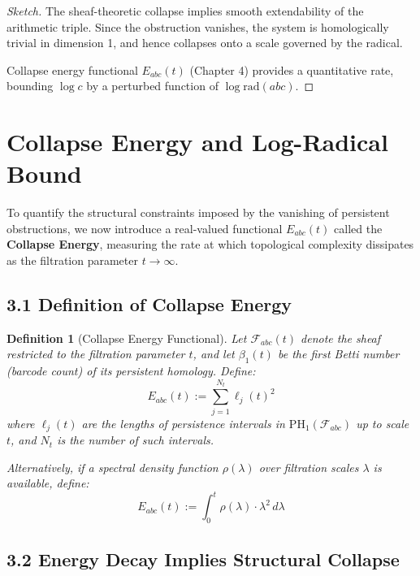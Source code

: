 \documentclass[11pt]{article}
\newtheorem{definition}[theorem]{Definition}
\begin{document}
\begin{proof}[Sketch]
The sheaf-theoretic collapse implies smooth extendability of the arithmetic triple. Since the obstruction vanishes, the system is homologically trivial in dimension 1, and hence collapses onto a scale governed by the radical.

Collapse energy functional $E_{abc}(t)$ (Chapter 4) provides a quantitative rate, bounding $\log c$ by a perturbed function of $\log \mathrm{rad}(abc)$.
\end{proof}



\section{Collapse Energy and Log-Radical Bound}

To quantify the structural constraints imposed by the vanishing of persistent obstructions, we now introduce a real-valued functional \( E_{abc}(t) \) called the \textbf{Collapse Energy}, measuring the rate at which topological complexity dissipates as the filtration parameter \( t \to \infty \).

\subsection{3.1 Definition of Collapse Energy}

\begin{definition}[Collapse Energy Functional]
Let \( \mathcal{F}_{abc}(t) \) denote the sheaf restricted to the filtration parameter \( t \), and let \( \beta_1(t) \) be the first Betti number (barcode count) of its persistent homology. Define:
\[
E_{abc}(t) := \sum_{j=1}^{N_t} \ell_j(t)^2
\]
where \( \ell_j(t) \) are the lengths of persistence intervals in \( \mathrm{PH}_1(\mathcal{F}_{abc}) \) up to scale \( t \), and \( N_t \) is the number of such intervals.

Alternatively, if a spectral density function \( \rho(\lambda) \) over filtration scales \( \lambda \) is available, define:
\[
E_{abc}(t) := \int_0^t \rho(\lambda) \cdot \lambda^2 \, d\lambda
\]
\end{definition}

\subsection{3.2 Energy Decay Implies Structural Collapse}
\end{document}
